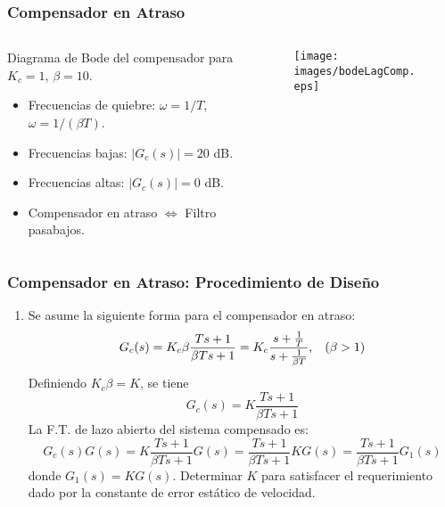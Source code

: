 \documentclass[aspectratio=169, handout]{beamer}
\theoremstyle{definition}
\theoremstyle{plain}
\theoremstyle{remark}
\newcounter{saveenumi}
\newcommand{\seti}{\setcounter{saveenumi}{\value{enumi}}}
\begin{document}
\begin{frame}[<+->]\frametitle{Compensador en Atraso}
\begin{columns}
	\begin{column}{0.5\textwidth}
	Diagrama de Bode del compensador para $K_c=1$, $\beta=10$.
	\begin{itemize}
		\item Frecuencias de quiebre: $\omega = 1/T$, $\omega = 1/(\beta T)$.
		\item Frecuencias bajas: $|G_c(s)| = 20$ dB.
		\item Frecuencias altas: $|G_c(s)| = 0$ dB.
		\item Compensador en atraso $\Leftrightarrow$ Filtro pasabajos.
	\end{itemize}
	\end{column}
	\begin{column}{0.5\textwidth}
	\begin{figure}
		\centering
		\texttt{[image: images/bodeLagComp.eps]}
	\end{figure}
	\end{column}
\end{columns}
\end{frame}

\begin{frame}[<+->]\frametitle{Compensador en Atraso: Procedimiento de Diseño}
	\begin{enumerate}
		\item Se asume la siguiente forma para el compensador en atraso:
		\begin{equation*}
			G_c(s) = K_c \beta \frac{Ts+1}{\beta Ts+1} = K_c \frac{s+\frac{1}{T}}{s+\frac{1}{\beta T}}, \hspace*{3mm} (\beta > 1)
		\end{equation*}
		\pause
		Definiendo $K_c \beta = K$, se tiene
		\begin{equation*}
			G_c(s) = K \frac{Ts+1}{\beta Ts+1}
		\end{equation*}
		\pause
		La F.T. de lazo abierto del sistema compensado es:
		\begin{equation*}
			G_c(s)G(s) = K \frac{Ts+1}{\beta Ts+1}G(s) = \frac{Ts+1}{\beta Ts+1} KG(s) = \frac{Ts+1}{\beta Ts+1} G_1(s)
		\end{equation*}
		donde $G_1(s) = KG(s)$.
		\pause
		Determinar $K$ para satisfacer el requerimiento dado por la constante de error estático de velocidad.
		\seti
	\end{enumerate}
\end{frame}
\end{document}
